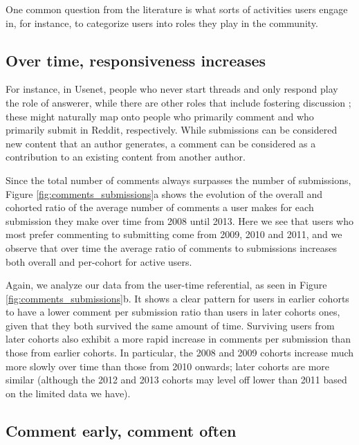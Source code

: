 One common question from the literature is what sorts of activities users engage in, for instance, to categorize users into roles they play in the community\cite{welser 2011 wikipedia roles paper from iconference}.  

\subsection{Over time, responsiveness increases}
For instance, in Usenet, people who never start threads and only respond play the role of answerer, while there are other roles that include fostering discussion \cite{http://www.cmu.edu/joss/content/articles/volume8/Welser/}; these might naturally map onto people who primarily comment and who primarily submit in Reddit, respectively.  While submissions can be considered new content that an author generates, a comment can be considered as a contribution to an existing content from another author.

Since the total number of comments always surpasses the number of submissions, Figure \ref{fig:comments_submissions}a shows the evolution of the overall and cohorted ratio of the average number of comments a user makes for each submission they make over time from 2008 until 2013. Here we see that users who most prefer commenting to submitting come from 2009, 2010 and 2011, and we observe that over time the average ratio of comments to submissions increases both overall and per-cohort for active users.

Again, we analyze our data from the user-time referential, as seen in Figure \ref{fig:comments_submissions}b. It shows a clear pattern for users in earlier cohorts to have a lower comment per submission ratio than users in later cohorts ones, given that they both survived the same amount of time.  Surviving users from later cohorts also exhibit a more rapid increase in comments per submission than those from earlier cohorts.  In particular, the 2008 and 2009 cohorts increase much more slowly over time than those from 2010 onwards; later cohorts are more similar (although the 2012 and 2013 cohorts may level off lower than 2011 based on the limited data we have). 

\subsection{Comment early, comment often}


